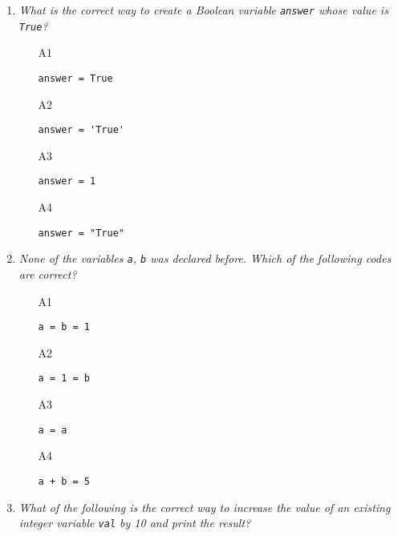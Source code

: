 \begin{enumerate}
\vspace{6mm}

\item {\em What is the correct way to create a Boolean variable {\tt answer} whose value is {\tt True}?}\\

\begin{enumerate}
\item[A1] 
\begin{verbatim}
answer = True
\end{verbatim}
\item[A2] 
\begin{verbatim}
answer = 'True'
\end{verbatim}
\item[A3] 
\begin{verbatim}
answer = 1
\end{verbatim}
\item[A4] 
\begin{verbatim}
answer = "True"
\end{verbatim}
\end{enumerate}

\vspace{6mm}

\item {\em None of the variables {\tt a}, {\tt b} was declared before. 
Which of the following codes are correct?}\\

\begin{enumerate}
\item[A1] 
\begin{verbatim}
a = b = 1
\end{verbatim}
\item[A2] 
\begin{verbatim}
a = 1 = b
\end{verbatim}
\item[A3] 
\begin{verbatim}
a = a
\end{verbatim}
\item[A4] 
\begin{verbatim}
a + b = 5
\end{verbatim}
\end{enumerate}

\vspace{6mm}

\item {\em What of the following is the correct way to increase the value of an existing integer 
variable {\tt val} by 10 and print the result?}\\


\end{enumerate}
